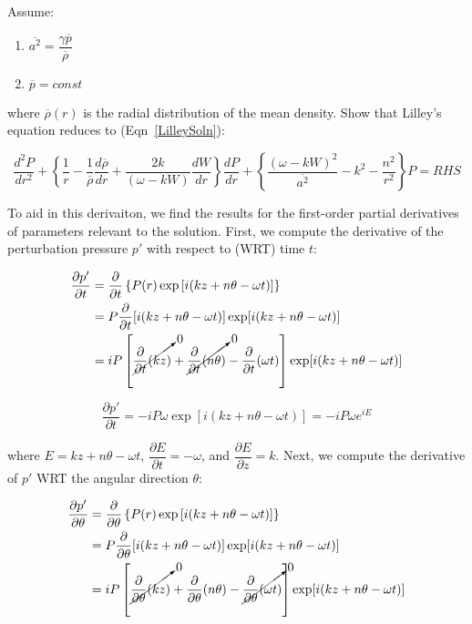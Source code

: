 \documentclass[]{aiaa-tc}%
\begin{document}
\noindent Assume:
\begin{enumerate}
  \item $\overline{a^2} = \dfrac{\gamma \overline{p}}{\overline{\rho}}$
  \item $\overline{p} = const$
\end{enumerate}

\noindent where $\overline{\rho}(r)$ is the radial distribution of the mean density.  Show that Lilley's equation reduces to (Eqn~\ref{LilleySoln}):

\begin{equation} \label{LilleySoln}
\dfrac{d^2 P}{dr^2}
+ \left\{ \dfrac{1}{r}
  - \dfrac{1}{\overline{\rho}} \dfrac{d\overline{\rho}}{dr}
  + \dfrac{2k}{(\omega - kW)} \dfrac{dW}{dr}
\right\} \dfrac{dP}{dr}
+ \left\{ \dfrac{(\omega - kW)^2}{\overline{a^2}} - k^2 - \dfrac{n^2}{r^2}
\right\} P = RHS
\end{equation}

To aid in this derivaiton, we find the results for the first-order partial derivatives of parameters relevant to the solution.  First, we compute the derivative of the perturbation pressure $p'$ with respect to (WRT) time $t$:

\newcommand\expterm{i(kz + n\theta -\omega t)}%

\begin{align*}
\dfrac{\partial p'}{\partial t} &= \dfrac{\partial}{\partial t}
  \left\{ P(r) \exp\left[ \expterm \right]\right\} \\
&= P \dfrac{\partial}{\partial t} [\expterm] \exp[\expterm] \\
&= iP \left[\cancelto{0}{\dfrac{\partial}{\partial t}(kz)      }
          + \cancelto{0}{\dfrac{\partial}{\partial t}(n\theta)}
                       - \dfrac{\partial}{\partial t}(\omega t)
    \right] \exp[\expterm]
\end{align*}

\begin{equation} \label{dpdt}
\boxed{\dfrac{\partial p'}{\partial t}
  = -iP\omega \exp[\expterm] = -iP\omega e^{iE} }
\end{equation}

\noindent where $E=kz + n\theta -\omega t$, $\dfrac{\partial E}{\partial t} = -\omega$, and $\dfrac{\partial E}{\partial z} = k$.  Next, we compute the derivative of $p'$ WRT the angular direction $\theta$:

\begin{align*}
\dfrac{\partial p'}{\partial \theta} &= \dfrac{\partial}{\partial \theta}
  \left\{ P(r) \exp\left[ \expterm \right]\right\} \\
&= P \dfrac{\partial}{\partial \theta} [\expterm] \exp[\expterm] \\
&= iP \left[\cancelto{0}{\dfrac{\partial}{\partial \theta}(kz)      }
                      + \dfrac{\partial}{\partial \theta}(n\theta)
          - \cancelto{0}{\dfrac{\partial}{\partial \theta}(\omega t)}
    \right] \exp[\expterm]
\end{align*}
\end{document}
